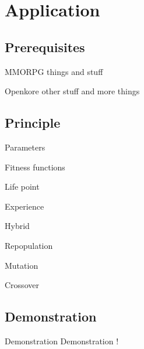 \section{Application}

\subsection{Prerequisites}

\begin{frame}{MMORPG}
  things and stuff
\end{frame}

\begin{frame}{Openkore}
  other stuff and more things
\end{frame}

\subsection{Principle}

\begin{frame}{Parameters}
\end{frame}

\begin{frame}{Fitness functions}

  \begin{block}{Life point}
  \end{block}

  \begin{block}{Experience}
  \end{block}

  \begin{block}{Hybrid}
  \end{block}

\end{frame}

\begin{frame}{Repopulation}

  \begin{block}{Mutation}
  \end{block}

  \begin{block}{Crossover}
  \end{block}

\end{frame}

\subsection{Demonstration}

\begin{frame}{Demonstration}
  Demonstration !
\end{frame}


